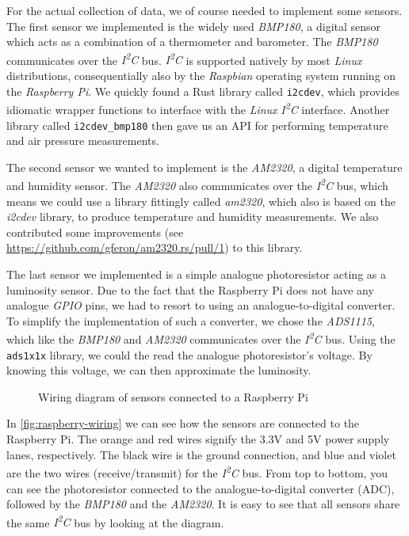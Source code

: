For the actual collection of data, we of course needed to implement some sensors. The first sensor
we implemented is the widely used \textit{BMP180}, a digital sensor which acts as a combination of a
thermometer and barometer. The \textit{BMP180} communicates over the \textit{I\textsuperscript{2}C}
bus. \textit{I\textsuperscript{2}C} is supported natively by most \textit{Linux} distributions,
consequentially also by the \textit{Raspbian} operating system running on the \textit{Raspberry Pi}.
We quickly found a Rust library called \texttt{i2cdev}, which provides idiomatic wrapper functions
to interface with the \textit{Linux} \textit{I\textsuperscript{2}C} interface. Another library
called \texttt{i2cdev\_bmp180} then gave us an API for performing temperature and air pressure
measurements.

The second sensor we wanted to implement is the \textit{AM2320}, a digital temperature and humidity
sensor. The \textit{AM2320} also communicates over the \textit{I\textsuperscript{2}C} bus, which
means we could use a library fittingly called \textit{am2320}, which also is based on the
\textit{i2cdev} library, to produce temperature and humidity measurements. We also contributed some
improvements (see \url{https://github.com/gferon/am2320.rs/pull/1}) to this library.

The last sensor we implemented is a simple analogue photoresistor acting as a luminosity sensor. Due
to the fact that the Raspberry Pi does not have any analogue \textit{GPIO} pins, we had to resort to
using an analogue-to-digital converter. To simplify the implementation of such a converter, we chose
the \textit{ADS1115}, which like the \textit{BMP180} and \textit{AM2320} communicates over the
\textit{I\textsuperscript{2}C} bus. Using the \texttt{ads1x1x} library, we could the read the
analogue photoresistor's voltage. By knowing this voltage, we can then approximate the luminosity.

\begin{figure}[H]
  \centering
  \caption{Wiring diagram of sensors connected to a Raspberry Pi}
  \label{fig:raspberry-wiring}
\end{figure}

In \autoref{fig:raspberry-wiring} we can see how the sensors are connected to the Raspberry Pi. The
orange and red wires signify the 3.3V and 5V power supply lanes, respectively. The black wire is the
ground connection, and blue and violet are the two wires (receive/transmit) for the
\textit{I\textsuperscript{2}C} bus. From top to bottom, you can see the photoresistor connected to
the analogue-to-digital converter (ADC), followed by the \textit{BMP180} and the \textit{AM2320}. It
is easy to see that all sensors share the same \textit{I\textsuperscript{2}C} bus by looking at the
diagram.
